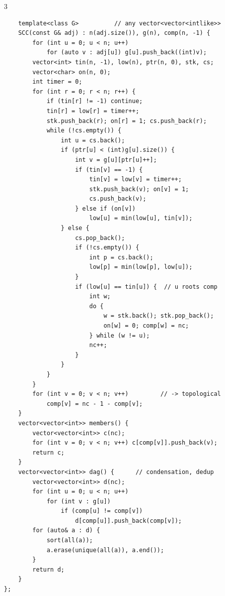 \documentclass[9pt,a4paper]{extarticle}
\begin{document}
\begin{multicols*}{3}
\begin{lstlisting}
    template<class G>          // any vector<vector<intlike>>
    SCC(const G& adj) : n(adj.size()), g(n), comp(n, -1) {
        for (int u = 0; u < n; u++)
            for (auto v : adj[u]) g[u].push_back((int)v);
        vector<int> tin(n, -1), low(n), ptr(n, 0), stk, cs;
        vector<char> on(n, 0);
        int timer = 0;
        for (int r = 0; r < n; r++) {
            if (tin[r] != -1) continue;
            tin[r] = low[r] = timer++;
            stk.push_back(r); on[r] = 1; cs.push_back(r);
            while (!cs.empty()) {
                int u = cs.back();
                if (ptr[u] < (int)g[u].size()) {
                    int v = g[u][ptr[u]++];
                    if (tin[v] == -1) {
                        tin[v] = low[v] = timer++;
                        stk.push_back(v); on[v] = 1;
                        cs.push_back(v);
                    } else if (on[v])
                        low[u] = min(low[u], tin[v]);
                } else {
                    cs.pop_back();
                    if (!cs.empty()) {
                        int p = cs.back();
                        low[p] = min(low[p], low[u]);
                    }
                    if (low[u] == tin[u]) {  // u roots comp
                        int w;
                        do {
                            w = stk.back(); stk.pop_back();
                            on[w] = 0; comp[w] = nc;
                        } while (w != u);
                        nc++;
                    }
                }
            }
        }
        for (int v = 0; v < n; v++)         // -> topological
            comp[v] = nc - 1 - comp[v];
    }
    vector<vector<int>> members() {
        vector<vector<int>> c(nc);
        for (int v = 0; v < n; v++) c[comp[v]].push_back(v);
        return c;
    }
    vector<vector<int>> dag() {      // condensation, dedup
        vector<vector<int>> d(nc);
        for (int u = 0; u < n; u++)
            for (int v : g[u])
                if (comp[u] != comp[v])
                    d[comp[u]].push_back(comp[v]);
        for (auto& a : d) {
            sort(all(a));
            a.erase(unique(all(a)), a.end());
        }
        return d;
    }
};
\end{lstlisting}


\end{multicols*}
\end{document}
